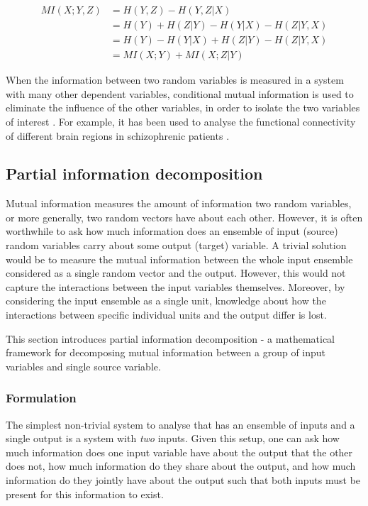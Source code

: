 \documentclass[12pt]{article}
\begin{document}
\begin{align}
MI(X;Y,Z) & = H(Y,Z) - H(Y,Z|X) \nonumber \\ 
		  & = H(Y) + H(Z|Y) - H(Y|X) - H(Z|Y,X) \nonumber \\ 
		  & = H(Y) - H(Y|X) + H(Z|Y) - H(Z|Y,X) \nonumber \\ 
		  & = MI(X;Y) + MI(X;Z|Y)
\label{eq:chain-rule-inf}
\end{align}

When the information between two random variables is measured in a system with many other dependent variables, conditional mutual information is used to eliminate the influence of the other variables, in order to isolate the two variables of interest \cite{williams-beer}. For example, it has been used to analyse the functional connectivity of different brain regions in schizophrenic patients \cite{brain-cond-inf}.

\subsection{Partial information decomposition}

Mutual information measures the amount of information two random variables, or more generally, two random vectors have about each other. However, it is often worthwhile to ask how much information does an ensemble of input (source) random variables carry about some output (target) variable. A trivial solution would be to measure the mutual information between the whole input ensemble considered as a single random vector and the output. However, this would not capture the interactions between the input variables themselves. Moreover, by considering the input ensemble as a single unit, knowledge about how the interactions between specific individual units and the output differ is lost. 

This section introduces partial information decomposition - a mathematical framework for decomposing mutual information between a group of input variables and single source variable.   

\subsubsection{Formulation}

The simplest non-trivial system to analyse that has an ensemble of inputs and a single output is a system with \textit{two} inputs. Given this setup, one can ask how much information does one input variable have about the output that the other does not, how much information do they share about the output, and how much information do they jointly have about the output such that both inputs must be present for this information to exist.
\end{document}
